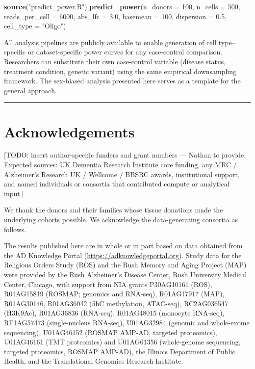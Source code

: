 \documentclass[
]{article}
\newenvironment{Shaded}{\begin{snugshade}}{\end{snugshade}}
\newcommand{\AttributeTok}[1]{\textcolor[rgb]{0.13,0.29,0.53}{#1}}
\newcommand{\DecValTok}[1]{\textcolor[rgb]{0.00,0.00,0.81}{#1}}
\newcommand{\FloatTok}[1]{\textcolor[rgb]{0.00,0.00,0.81}{#1}}
\newcommand{\FunctionTok}[1]{\textcolor[rgb]{0.13,0.29,0.53}{\textbf{#1}}}
\newcommand{\NormalTok}[1]{#1}
\newcommand{\StringTok}[1]{\textcolor[rgb]{0.31,0.60,0.02}{#1}}
\begin{document}
\begin{Shaded}
\begin{Highlighting}[]
\FunctionTok{source}\NormalTok{(}\StringTok{"predict\_power.R"}\NormalTok{)}
\FunctionTok{predict\_power}\NormalTok{(}\AttributeTok{n\_donors =} \DecValTok{100}\NormalTok{, }\AttributeTok{n\_cells =} \DecValTok{500}\NormalTok{, }\AttributeTok{reads\_per\_cell =} \DecValTok{6000}\NormalTok{,}
              \AttributeTok{abs\_lfc =} \FloatTok{3.0}\NormalTok{, }\AttributeTok{basemean =} \DecValTok{100}\NormalTok{, }\AttributeTok{dispersion =} \FloatTok{0.5}\NormalTok{,}
              \AttributeTok{cell\_type =} \StringTok{"Oligo"}\NormalTok{)}
\end{Highlighting}
\end{Shaded}

All analysis pipelines are publicly available to enable generation of
cell type--specific or dataset-specific power curves for any
case-control comparison. Researchers can substitute their own
case-control variable (disease status, treatment condition, genetic
variant) using the same empirical downsampling framework. The sex-biased
analysis presented here serves as a template for the general approach.

\begin{center}\rule{0.5\linewidth}{0.5pt}\end{center}

\section{Acknowledgements}\label{acknowledgements}

{[}TODO: insert author-specific funders and grant numbers --- Nathan to
provide. Expected sources: UK Dementia Research Institute core funding,
any MRC / Alzheimer's Research UK / Wellcome / BBSRC awards,
institutional support, and named individuals or consortia that
contributed compute or analytical input.{]}

We thank the donors and their families whose tissue donations made the
underlying cohorts possible. We acknowledge the data-generating
consortia as follows.

The results published here are in whole or in part based on data
obtained from the AD Knowledge Portal
(\url{https://adknowledgeportal.org}). Study data for the Religious
Orders Study (ROS) and the Rush Memory and Aging Project (MAP) were
provided by the Rush Alzheimer's Disease Center, Rush University Medical
Center, Chicago, with support from NIA grants P30AG10161 (ROS),
R01AG15819 (ROSMAP; genomics and RNA-seq), R01AG17917 (MAP), R01AG30146,
R01AG36042 (5hC methylation, ATAC-seq), RC2AG036547 (H3K9Ac), R01AG36836
(RNA-seq), R01AG48015 (monocyte RNA-seq), RF1AG57473 (single-nucleus
RNA-seq), U01AG32984 (genomic and whole-exome sequencing), U01AG46152
(ROSMAP AMP-AD, targeted proteomics), U01AG46161 (TMT proteomics) and
U01AG61356 (whole-genome sequencing, targeted proteomics, ROSMAP
AMP-AD), the Illinois Department of Public Health, and the Translational
Genomics Research Institute.
\end{document}
